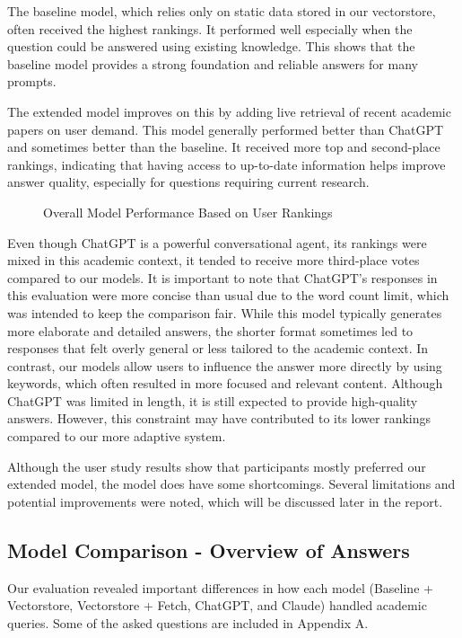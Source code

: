 \documentclass[fleqn,moreauthors,10pt]{ds_report}
\begin{document}
The baseline model, which relies only on static data stored in our vectorstore, often received the highest rankings. It performed well especially when the question could be answered using existing knowledge. This shows that the baseline model provides a strong foundation and reliable answers for many prompts.

The extended model improves on this by adding live retrieval of recent academic papers on user demand. This model generally performed better than ChatGPT and sometimes better than the baseline. It received more top and second-place rankings, indicating that having access to up-to-date information helps improve answer quality, especially for questions requiring current research.


\begin{figure}[htbp]
    \centering
    
    \caption{Overall Model Performance Based on User Rankings}
    \label{fig:summary}
\end{figure}

Even though ChatGPT is a powerful conversational agent, its rankings were mixed in this academic context, it tended to receive more third-place votes compared to our models. It is important to note that ChatGPT’s responses in this evaluation were more concise than usual due to the word count limit, which was intended to keep the comparison fair. While this model typically generates more elaborate and detailed answers, the shorter format sometimes led to responses that felt overly general or less tailored to the academic context. In contrast, our models allow users to influence the answer more directly by using keywords, which often resulted in more focused and relevant content. Although ChatGPT was limited in length, it is still expected to provide high-quality answers. However, this constraint may have contributed to its lower rankings compared to our more adaptive system.

Although the user study results show that participants mostly preferred our extended model, the model does have some shortcomings. Several limitations and potential improvements were noted, which will be discussed later in the report.

\subsection*{Model Comparison - Overview of Answers}

Our evaluation revealed important differences in how each model (Baseline + Vectorstore, Vectorstore + Fetch, ChatGPT, and Claude) handled academic queries. Some of the asked questions are included in Appendix A.
\end{document}

